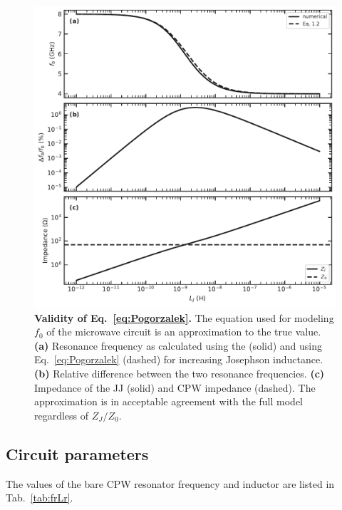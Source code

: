 \begin{figure}
	\centering
	\includegraphics[width=\linewidth]{chapter-gJJ-CPR/figs/SMFigure-validity}
	\caption{
		\textbf{Validity of Eq.~\ref{eq:Pogorzalek}.}
		The equation used for modeling $f_0$ of the microwave circuit is an approximation to the true value.
		\textbf{(a)} Resonance frequency as calculated using the  (solid) and using Eq.~\ref{eq:Pogorzalek} (dashed) for increasing Josephson inductance.
		\textbf{(b)} Relative difference between the two resonance frequencies.
		\textbf{(c)} Impedance of the JJ (solid) and CPW impedance (dashed).
		The approximation is in acceptable agreement with the full model regardless of $Z_J/Z_0$.
	}
	\label{fig:SMval}
\end{figure}


\subsection{Circuit parameters}

The values of the bare CPW resonator frequency and inductor are listed in Tab.~\ref{tab:frLr}.

